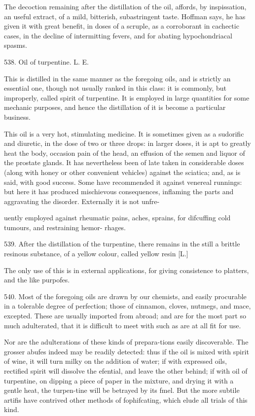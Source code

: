 \documentclass{article}
\begin{document}
The decoction remaining after the distillation of the oil, affords, by inspissation, an useful extract, of a mild, bitterish, subastringent taste. Hoffman says, he has given it with great benefit, in doses of a scruple, as a corroborant in cachectic cases, in the decline of intermitting fevers, and for abating hypochondriacal spasms.

538. Oil of turpentine. L. E.

This is distilled in the same manner as the foregoing oils, and is strictly an essential one, though not usually ranked in this class: it is commonly, but improperly, called spirit of turpentine. It is employed in large quantities for some mechanic purposes, and hence the distillation of it is become a particular business.

This oil is a very hot, stimulating medicine. It is sometimes given as a sudorific and diuretic, in the dose of two or three drops: in larger doses, it is apt to greatly heat the body, occasion pain of the head, an effusion of the semen and liquor of the prostate glands. It has nevertheless been of late taken in considerable doses (along with honey or other convenient vehicles) against the sciatica; and, as is said, with good success. Some have recommended it against venereal runnings: but here it has produced mischievous consequences, inflaming the parts and aggravating the disorder. Externally it is not unfre-

uently employed against rheumatic pains, aches, sprains, for difcuffing cold tumours, and restraining hemor- rhages.

539. After the distillation of the turpentine, there remains in the still a brittle resinous substance, of a yellow colour, called yellow resin [L.]

The only use of this is in external applications, for giving consistence to platters, and the like purpofes.

540. Most of the foregoing oils are drawn by our chemists, and easily procurable in a tolerable degree of perfection; those of cinnamon, cloves, nutmegs, and mace, excepted. These are usually imported from abroad; and are for the most part so much adulterated, that it is difficult to meet with such as are at all fit for use.

Nor are the adulterations of these kinds of prepara-tions easily discoverable. The grosser abufes indeed may be readily detected: thus if the oil is mixed with spirit of wine, it will turn milky on the addition of water; if with expressed oils, rectified spirit will dissolve the efential, and leave the other behind; if with oil of turpentine, on dipping a piece of paper in the mixture, and drying it with a gentle heat, the turpen-tine will be betrayed by its fmel. But the more subtile artifis have contrived other methods of fophifcating, which elude all trials of this kind.
\end{document}
